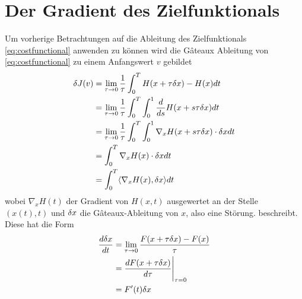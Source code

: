 \section{Der Gradient des Zielfunktionals}
Um vorherige Betrachtungen auf die Ableitung des Zielfunktionals \eqref{eq:costfunctional} anwenden zu können wird die Gâteaux Ableitung von \eqref{eq:costfunctional} zu einem Anfangswert $v$ gebildet
\begin{equation}
\label{eq:gatcost}
\begin{aligned}
 \delta J(v)  &= \lim_{\tau\to 0} \frac{1}{\tau}\int_0^T H(x+\tau\delta x)-H(x) dt\\
	    &= \lim_{\tau\to 0} \frac{1}{\tau}\int_0^T \int_0^1 \frac{d}{ds}H(x+s\tau\delta x) dt\\
	    &= \lim_{\tau\to 0} \frac{1}{\tau}\int_0^T \int_0^1 \nabla_x H(x+s\tau\delta x)\cdot \delta x dt\\
	    &= \int_0^T \nabla_x H(x)\cdot \delta x dt\\
	    &= \int_0^T \langle \nabla_x H(x), \delta x \rangle dt\\  
\end{aligned}
\end{equation}
wobei $\nabla_x H(t)$ der Gradient von $H(x,t)$ ausgewertet an der Stelle $(x(t),t)$ und $\delta x$ die Gâteaux-Ableitung von $x$, also eine Störung. beschreibt. Diese hat die Form
\begin{equation}
\label{eq:tlm}
\begin{aligned}
  \frac{d \delta x}{dt} &= \lim_{\tau\to 0}\frac{F(x+\tau \delta x)-F(x)}{\tau}\\
			 &= \frac{d F(x+\tau\delta x)}{d\tau} \Bigg\rvert_{\tau=0}\\
			 &= F'(t)\delta x
\end{aligned} 
\end{equation}

